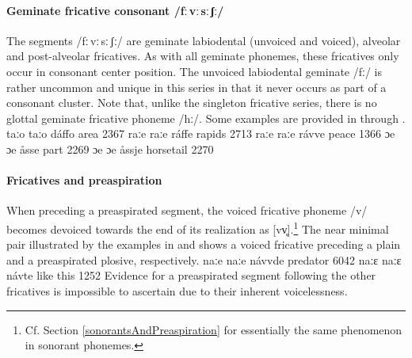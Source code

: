 \paragraph{Geminate fricative consonant /fː\,vː\,sː\,ʃː/}
The segments /fː\,vː\,sː\,ʃː/ are geminate labiodental (unvoiced and voiced), alveolar and post-alveolar fricatives. As with all geminate phonemes, these fricatives only occur in consonant center position. The unvoiced labiodental geminate /fː/ is rather uncommon and unique in this series in that it never occurs as part of a consonant cluster. Note that, unlike the singleton fricative series, there is no glottal geminate fricative phoneme /hː/. Some examples are provided in  through .
	{taːo}	{taːo}	{dáffo}	{area\BS{}}		{2367}%
	{raːe}	{raːe}	{ráffe}	{rapids\BS{}}		{2713}%
	{raːe}	{raːe}	{rávve}	{peace\BS{}}		{1366}%
	{ɔe}	{ɔe}	{åsse}	{part\BS{}}	{2269}
	{ɔe}	{ɔe}	{åssje}	{horsetail\BS{}}	{2270}


\paragraph{Fricatives and preaspiration}\label{fricativesAndPreaspiration}
When preceding a preaspirated segment, the voiced fricative phoneme /v/ becomes devoiced towards the end of its realization as [vv̥].\footnote{Cf. Section \ref{sonorantsAndPreaspiration} for essentially the same phenomenon in sonorant phonemes.} 
The near minimal pair illustrated by the examples in  and  shows a voiced fricative preceding a plain and a preaspirated plosive, respectively.
	{naːe}	{naːe}	{návvde}	{predator\BS{}}		{6042}%
		{naːɛ}	{naːɛ}	{návte}	{like this}		{1252}%
Evidence for a preaspirated segment following the other fricatives is impossible to ascertain due to their inherent voicelessness.



